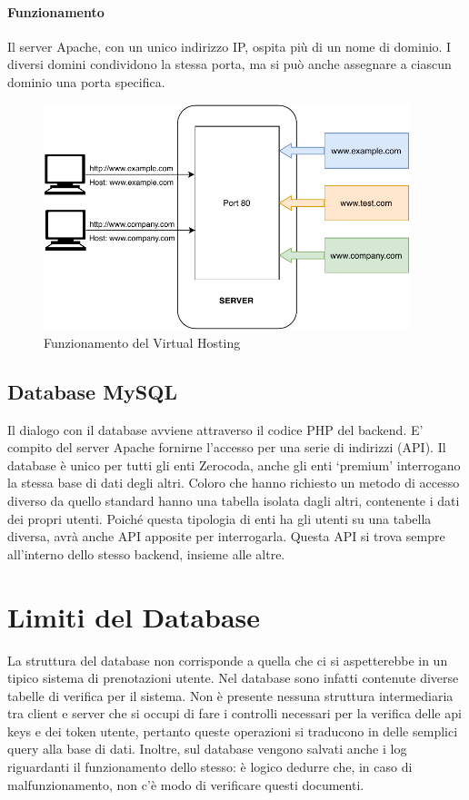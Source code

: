 \paragraph{Funzionamento} Il server Apache, con un unico indirizzo IP, ospita più di un nome di dominio. I diversi domini condividono la stessa porta, ma si può anche assegnare a ciascun dominio una porta specifica.

\begin{figure}[H]
    \centering
    \includegraphics[width=0.95\textwidth]{images/02_5_virtual_hosting.pdf}
    \caption{Funzionamento del Virtual Hosting}
    \label{fig:virtualhosting}
\end{figure}

\subsection{Database MySQL}
Il dialogo con il database avviene attraverso il codice PHP del backend. E' compito del server Apache fornirne l'accesso per una serie di indirizzi (API). Il database è unico per tutti gli enti Zerocoda, anche gli enti `premium' interrogano la stessa base di dati degli altri. Coloro che hanno richiesto un metodo di accesso diverso da quello standard hanno una tabella isolata dagli altri, contenente i dati dei propri utenti. Poiché questa tipologia di enti ha gli utenti su una tabella diversa, avrà anche API apposite per interrogarla. Questa API si trova sempre all'interno dello stesso backend, insieme alle altre.

\section{Limiti del Database}
La struttura del database non corrisponde a quella che ci si aspetterebbe in un tipico sistema di prenotazioni utente. Nel database sono infatti contenute diverse tabelle di verifica per il sistema. Non è presente nessuna struttura intermediaria tra client e server che si occupi di fare i controlli necessari per la verifica delle api keys e dei token utente, pertanto queste operazioni si traducono in delle semplici query alla base di dati. Inoltre, sul database vengono salvati anche i log riguardanti il funzionamento dello stesso: è logico dedurre che, in caso di malfunzionamento, non c'è modo di verificare questi documenti.

